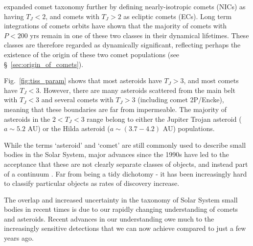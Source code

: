 \cite{1996ASPC..107..173L} expanded comet taxonomy further by defining nearly-isotropic comets (NICs) as having $T_J < 2$, and comets with  $T_J > 2$ as ecliptic comets (ECs). Long term integrations of comets orbits have shown that the majority of comets with $P < 200$ yrs remain in one of these two classes in their dynamical lifetimes. These classes are therefore regarded as dynamically significant, reflecting perhaps the existence of the origin of these two comet populations (see \S~\ref{sec:origin_of_comets}).

Fig.~\ref{fig:tiss_param} shows that most asteroids have $T_J>3$, and most comets have $T_J<3$. However, there are many asteroids scattered from the main belt with $T_J < 3$ and several comets with  $T_J > 3$ (including comet 2P/Encke), meaning that these boundaries are far from impermeable. The majority of asteroids in the $2 < T_J < 3$ range belong to either the Jupiter Trojan asteroid ($a \sim 5.2$ AU) or the Hilda asteroid ($a \sim (3.7-4.2)$ AU) populations.

While the terms `asteroid' and `comet' are still commonly used to describe small bodies in the Solar System, major advances since the 1990s have led to the acceptance that these are not clearly separate classes of objects, and instead part of a continuum \citep{1989aste.conf..880W, 2002aste.book..669W}. Far from being a tidy dichotomy - it has been increasingly hard to classify particular objects as rates of discovery increase.


The overlap and increased uncertainty in the taxonomy of Solar System small bodies in recent times is due to our rapidly changing understanding of comets and asteroids. Recent advances in our understanding owe much to the increasingly sensitive detections that we can now achieve compared to just a few years ago.

